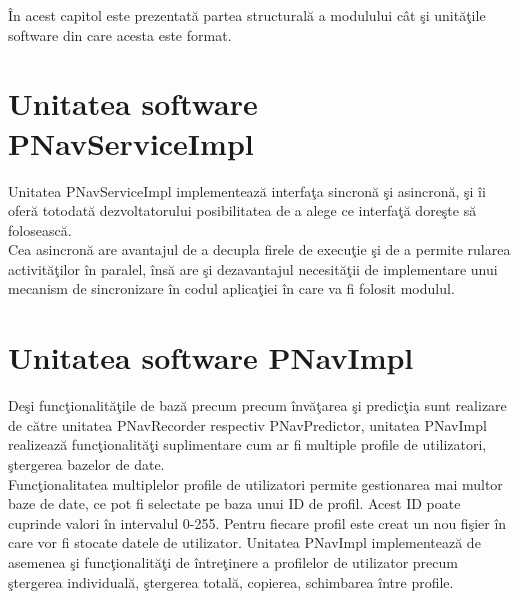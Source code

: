 \label{cap2}


\label{Chapter2} %

\thispagestyle{fancy}

În acest capitol este prezentată partea structurală a modulului cât şi unităţile software din care acesta este format.

\section{Unitatea software PNavServiceImpl} 
Unitatea PNavServiceImpl implementează interfaţa sincronă şi asincronă, şi îi oferă totodată dezvoltatorului posibilitatea de a alege ce interfaţă doreşte să folosească.
\vspace{6pt}
\\Cea asincronă are avantajul de a decupla firele de execuţie şi de a permite rularea activităţilor în paralel, însă are şi dezavantajul necesităţii de implementare unui mecanism de sincronizare în codul aplicaţiei în care va fi folosit modulul.


\section{Unitatea software PNavImpl} 
Deşi funcţionalităţile de bază precum precum învăţarea şi predicţia sunt realizare de către unitatea PNavRecorder respectiv PNavPredictor, unitatea PNavImpl realizează funcţionalităţi suplimentare cum ar fi multiple profile de utilizatori, ştergerea bazelor de date.
\vspace{6pt}
\\Funcţionalitatea multiplelor profile de utilizatori permite gestionarea mai multor baze de date, ce pot fi selectate pe baza unui ID de profil.
Acest ID poate cuprinde valori în intervalul 0-255. Pentru fiecare profil este creat un nou fişier în care vor fi stocate datele de utilizator. Unitatea PNavImpl implementează de asemenea şi funcţionalităţi de întreţinere a profilelor de utilizator precum ştergerea individuală, ştergerea totală, copierea, schimbarea între profile.

